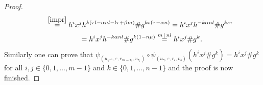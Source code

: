 \begin{proof}
\begin{gather*}
\qquad{} \stackrel{\eqref{impr}} {=} h^{i}x^{j} h^{k(\tau l - \alpha n l - l \tau + \beta m)} \# g^{ks(\tau - \alpha n)}
 = h^{i}x^{j} h^{-k \alpha n l } \# g^{ks\tau} \\
 \qquad \ {} = h^{i}x^{j} h^{-k \alpha n l } \# g^{k(1-n \mu)} \stackrel{m \,|\, nl} = h^{i}x^{j} \# g^{k}.
\end{gather*}
Similarly one can prove that $\psi_{(u_{\gamma^{-1}}, \varepsilon, r_{m-\tau_{2}}, v_{\tau_{1}})} \circ \psi_{(u_{\gamma}, \varepsilon, r_{l}, v_{s})} (h^{i}x^{j} \# g^{k}) = h^{i}x^{j} \# g^{k}$ for all $i, j \in \{0, 1,\dots, m-1\}$ and $k \in \{0, 1,\dots, n-1\}$ and the proof is now finished.
\end{proof}
